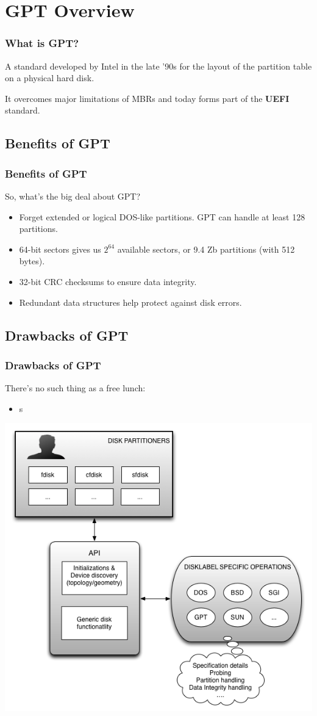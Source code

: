 \section{GPT Overview}
\begin{frame}\frametitle{What is GPT?}
  A standard developed by Intel in the late '90s for the layout of the partition table on a physical hard disk.\newline

  It overcomes major limitations of MBRs and today forms part of the \textbf{UEFI} standard.
\end{frame}

\subsection{Benefits of GPT}
\begin{frame}\frametitle{Benefits of GPT}
  So, what's the big deal about GPT?
  \begin{itemize}
  \item Forget extended or logical DOS-like partitions. GPT can handle at least 128 partitions.
  \item 64-bit sectors gives us $2^{64}$ available sectors, or 9.4 Zb partitions (with 512 bytes).
  \item 32-bit CRC checksums to ensure data integrity.
  \item Redundant data structures help protect against disk errors.
  \end{itemize}
\end{frame}

\subsection{Drawbacks of GPT}
\begin{frame}\frametitle{Drawbacks of GPT}
  There's no such thing as a free lunch:
  \begin{itemize}
    \item s
  \end{itemize}
\end{frame}

\begin{frame}
  \includegraphics[scale=0.35]{img/fdisk-arch.png}
\end{frame}

